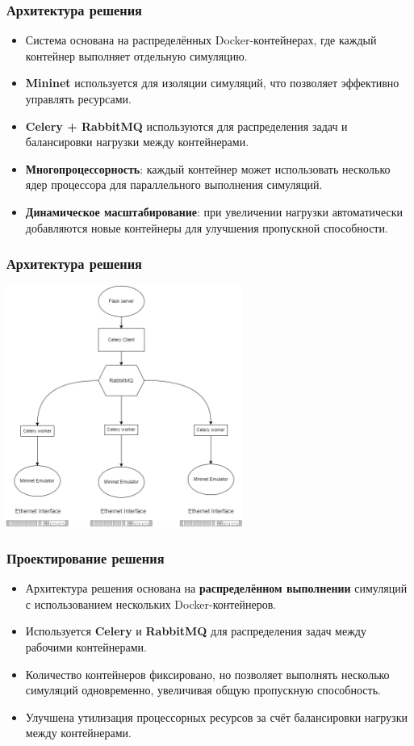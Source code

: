 \documentclass{beamer}
\begin{document}
\begin{frame}[fragile]
  \frametitle{Архитектура решения}
  \begin{itemize}
    \item Система основана на распределённых Docker-контейнерах, где каждый контейнер выполняет отдельную симуляцию.
    \item \textbf{Mininet} используется для изоляции симуляций, что позволяет эффективно управлять ресурсами.
    \item \textbf{Celery + RabbitMQ} используются для распределения задач и балансировки нагрузки между контейнерами.
    \item \textbf{Многопроцессорность}: каждый контейнер может использовать несколько ядер процессора для параллельного выполнения симуляций.
    \item \textbf{Динамическое масштабирование}: при увеличении нагрузки автоматически добавляются новые контейнеры для улучшения пропускной способности.
  \end{itemize}
\end{frame}


\begin{frame}[fragile]
  \frametitle{Архитектура решения}
  \begin{center}
    \includegraphics[width=0.58\textwidth]{example.png}
  \end{center}
\end{frame}

\begin{frame}[fragile]
  \frametitle{Проектирование решения}
  \begin{itemize}
    \item Архитектура решения основана на \textbf{распределённом выполнении} симуляций с использованием нескольких Docker-контейнеров.
    \item Используется \textbf{Celery} и \textbf{RabbitMQ} для распределения задач между рабочими контейнерами.
    \item Количество контейнеров фиксировано, но позволяет выполнять несколько симуляций одновременно, увеличивая общую пропускную способность.
    \item Улучшена утилизация процессорных ресурсов за счёт балансировки нагрузки между контейнерами.
  \end{itemize}
\end{frame}
\end{document}
